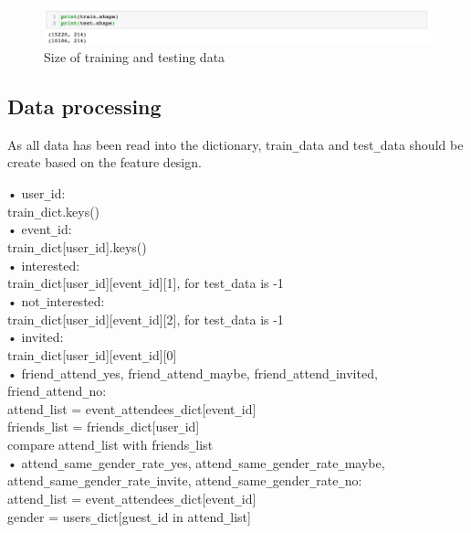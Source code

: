 \documentclass{article}
\begin{document}
\begin{figure}[H]
  \centering
  \includegraphics[width=1.0\textwidth]{img/Picture 0}
  \caption{Size of training and testing data}
\end{figure}

\subsection{Data processing}

As all data has been read into the dictionary, train\verb+_+data and test\verb+_+data should be create based on the feature design.

•	user\verb+_+id: \\
	train\verb+_+dict.keys()\\
•	event\verb+_+id: \\
	train\verb+_+dict[user\verb+_+id].keys()\\
•	interested: \\
	train\verb+_+dict[user\verb+_+id][event\verb+_+id][1], for test\verb+_+data is -1\\
•	not\verb+_+interested: \\
	train\verb+_+dict[user\verb+_+id][event\verb+_+id][2], for test\verb+_+data is -1\\
•	invited: \\
	train\verb+_+dict[user\verb+_+id][event\verb+_+id][0]\\
•	friend\verb+_+attend\verb+_+yes, friend\verb+_+attend\verb+_+maybe, friend\verb+_+attend\verb+_+invited, friend\verb+_+attend\verb+_+no: \\
	attend\verb+_+list = event\verb+_+attendees\verb+_+dict[event\verb+_+id]\\
	friends\verb+_+list = friends\verb+_+dict[user\verb+_+id]\\
	compare attend\verb+_+list with friends\verb+_+list\\
•	attend\verb+_+same\verb+_+gender\verb+_+rate\verb+_+yes, attend\verb+_+same\verb+_+gender\verb+_+rate\verb+_+maybe, attend\verb+_+same\verb+_+gender\verb+_+rate\verb+_+invite, attend\verb+_+same\verb+_+gender\verb+_+rate\verb+_+no: \\
	attend\verb+_+list = event\verb+_+attendees\verb+_+dict[event\verb+_+id]\\
	gender = users\verb+_+dict[guest\verb+_+id in attend\verb+_+list]\\
\end{document}
